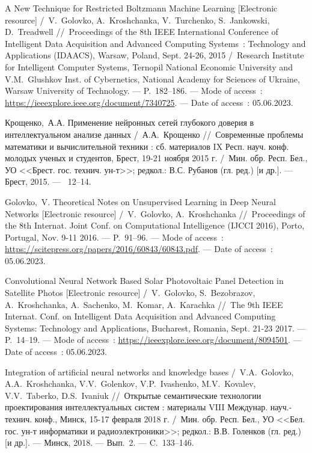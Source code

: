 A New Technique for Restricted Boltzmann Machine Learning [Electronic resource] /~V.~Golovko, A.~Kroshchanka, V.~Turchenko, S.~Jankowski, D.~Treadwell
\newblock //~Proceedings of the 8th IEEE International Conference of Intelligent Data Acquisition and Advanced Computing Systems~: Technology and Applications (IDAACS), Warsaw, Poland, Sept. 24-26, 2015
\newblock /~Research Institute for Intelligent Computer Systems, Ternopil National Economic University and V.M.~Glushkov Inst. of Cybernetics, National Academy for Sciences of Ukraine, Warsaw University of Technology. ---
\newblock P.~182--186. ---
\newblock Mode of access~: \url{https://ieeexplore.ieee.org/document/7340725}. ---
\newblock Date of access~: 05.06.2023.

Крощенко,~А.А. Применение нейронных сетей глубокого доверия в интеллектуальном анализе данных /~А.А.~Крощенко
\newblock //~Современные проблемы математики и вычислительной техники : сб. материалов IX Респ. науч. конф. молодых ученых и студентов, Брест, 19-21 ноября 2015 г.
\newblock /~Мин. обр. Респ. Бел., УО <<Брест. гос. технич. ун-т>>; редкол.: В.С. Рубанов (гл. ред.) [и др.]. ---
\newblock Брест, 2015. ---
~12--14.

Golovko,~V. Theoretical Notes on Unsupervised Learning in Deep Neural Networks [Electronic resource] /~V.~Golovko, A.~Kroshchanka
\newblock //~Proceedings of the 8th Internat. Joint Conf. on Computational Intelligence (IJCCI 2016), Porto, Portugal, Nov. 9-11 2016. ---
\newblock P.~91--96. ---
\newblock Mode of access~: \url{https://scitepress.org/papers/2016/60843/60843.pdf}. ---
\newblock Date of access~: 05.06.2023.

Convolutional Neural Network Based Solar Photovoltaic Panel Detection in Satellite Photos [Electronic resource] /~V.~Golovko, S.~Bezobrazov, A.~Kroshchanka, A.~Sachenko, M.~Komar, A.~Karachka
\newblock //~The 9th IEEE Internat. Conf. on Intelligent Data Acquisition and Advanced Computing Systems: Technology and Applications, Bucharest, Romania, Sept. 21-23 2017. ---
\newblock P.~14--19. ---
\newblock Mode of access~: \url{https://ieeexplore.ieee.org/document/8094501}. ---
\newblock Date of access~: 05.06.2023.

Integration of artiﬁcial neural networks and knowledge bases /~V.A.~Golovko, A.A.~Kroshchanka, V.V.~Golenkov, V.P.~Ivashenko, M.V.~Kovalev, V.V.~Taberko, D.S.~Ivaniuk
\newblock //~Открытые семантические технологии проектирования интеллектуальных систем : материалы VIII Междунар. науч.-технич. конф., Минск, 15-17 февраля 2018 г.
\newblock /~Мин. обр. Респ. Бел., УО <<Бел. гос. ун-т информатики и радиоэлектроники>>; редкол.: В.В. Голенков (гл. ред.) [и др.]. ---
\newblock Минск, 2018. ---
\newblock Вып.~2. ---
\newblock C.~133--146.

